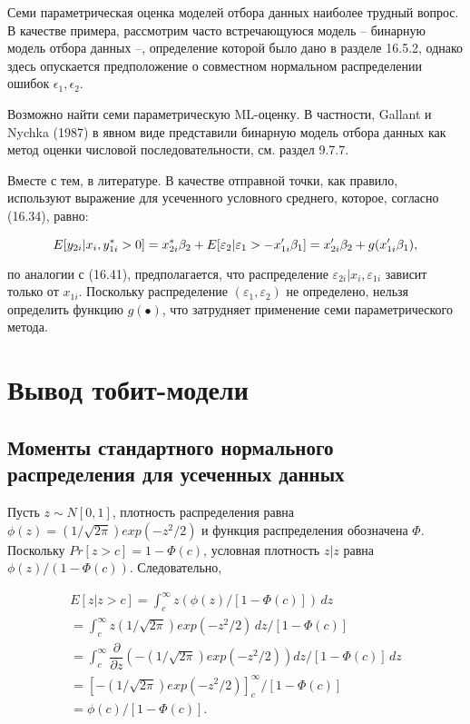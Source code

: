 Семи параметрическая оценка моделей отбора данных наиболее трудный вопрос. В качестве примера, рассмотрим часто встречающуюся модель -- бинарную модель отбора данных --, определение которой было дано в разделе 16.5.2, однако здесь опускается предположение о совместном нормальном распределении ошибок $\epsilon_1,\epsilon_2$.


Возможно найти семи параметрическую ML-оценку. В частности, Gallant и Nychka (1987) в явном виде представили бинарную модель отбора данных как метод оценки числовой последовательности, см. раздел 9.7.7.

Вместе с тем, в литературе. В качестве отправной точки, как правило, используют выражение для усеченного условного среднего, которое, согласно (16.34), равно: 

\begin{equation}
E[y_{2i}|x_i,y_{1i}^{*}>0]=x_{2i}^{*}\beta_2+E[\varepsilon_2|\varepsilon_1>-x_{1i}'\beta_1]\\
=x_{2i}'\beta_2+g(x_{1i}'\beta_1),
\end{equation}

по аналогии с (16.41), предполагается, что распределение $\varepsilon_{2i}|x_i,\varepsilon_{1i}$ зависит только от $x_{1i}$. Поскольку распределение $(\varepsilon_1,\varepsilon_2)$ не определено, нельзя определить функцию $g(\bullet)$, что затрудняет применение семи параметрического метода. 


\section{Вывод тобит-модели}

\subsection{Моменты стандартного нормального распределения для усеченных данных}

Пусть $z{\sim}N[0,1]$, плотность распределения равна $\phi(z)=(1/\sqrt{2\pi})exp(-z^2/2)$ и функция распределения обозначена $\Phi$. Поскольку $Pr[z>c]=1-\Phi(c)$, условная плотность $z|z$ равна $\phi(z)/(1-\Phi(c))$. Следовательно,


\begin{multline}
E[z|z>c]=\int_c^{\infty}z(\phi(z)/[1-\Phi(c)])\,dz\\
=\int_c^{\infty} z (1/\sqrt{2\pi})exp(-z^2/2) \,dz /[1-\Phi(c)]\\
=\int_c^{\infty}
\dfrac{\partial}{\partial{z}}
\left(-(1/\sqrt{2\pi})exp(-z^2/2)\right)
dz/
[1-\Phi(c)]\,dz\\
=\left[ -(1/\sqrt{2\pi})exp(-z^2/2) \right]_c^{\infty}/ [1-\Phi(c)]\\
=\phi(c)/[1-\Phi(c)].
\end{multline}

